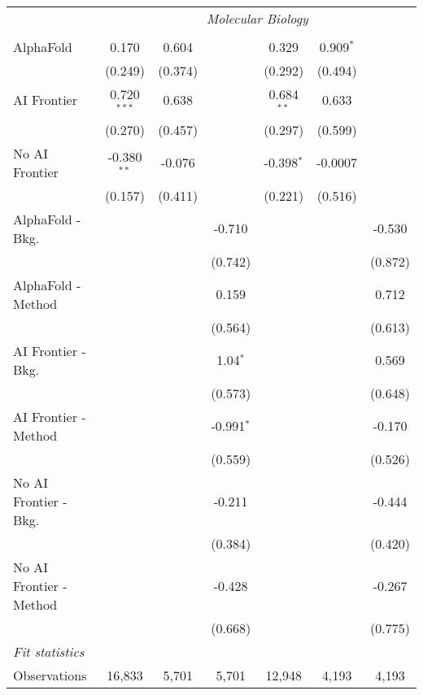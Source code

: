 \begin{tabular}{lcccccc}
 & \multicolumn{6}{c}{\textit{Molecular Biology}} \\ \\
   AlphaFold               & 0.170         & 0.604   &              & 0.329        & 0.909$^{*}$ &   \\   
                           & (0.249)       & (0.374) &              & (0.292)      & (0.494)     &   \\   
   AI Frontier             & 0.720$^{***}$ & 0.638   &              & 0.684$^{**}$ & 0.633       &   \\   
                           & (0.270)       & (0.457) &              & (0.297)      & (0.599)     &   \\   
   No AI Frontier          & -0.380$^{**}$ & -0.076  &              & -0.398$^{*}$ & -0.0007     &   \\   
                           & (0.157)       & (0.411) &              & (0.221)      & (0.516)     &   \\   
   AlphaFold - Bkg.        &               &         & -0.710       &              &             & -0.530\\   
                           &               &         & (0.742)      &              &             & (0.872)\\   
   AlphaFold - Method      &               &         & 0.159        &              &             & 0.712\\   
                           &               &         & (0.564)      &              &             & (0.613)\\   
   AI Frontier - Bkg.      &               &         & 1.04$^{*}$   &              &             & 0.569\\   
                           &               &         & (0.573)      &              &             & (0.648)\\   
   AI Frontier - Method    &               &         & -0.991$^{*}$ &              &             & -0.170\\   
                           &               &         & (0.559)      &              &             & (0.526)\\   
   No AI Frontier - Bkg.   &               &         & -0.211       &              &             & -0.444\\   
                           &               &         & (0.384)      &              &             & (0.420)\\   
   No AI Frontier - Method &               &         & -0.428       &              &             & -0.267\\   
                           &               &         & (0.668)      &              &             & (0.775)\\   
   \midrule
   \emph{Fit statistics}\\
   Observations            & 16,833        & 5,701   & 5,701        & 12,948       & 4,193       & 4,193\\  
   

\end{tabular}
